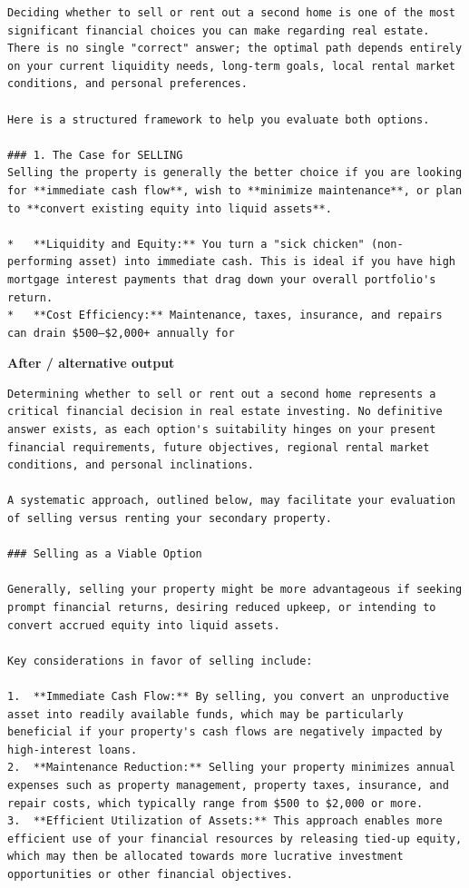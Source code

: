 \begin{Verbatim}
Deciding whether to sell or rent out a second home is one of the most significant financial choices you can make regarding real estate. There is no single "correct" answer; the optimal path depends entirely on your current liquidity needs, long-term goals, local rental market conditions, and personal preferences.

Here is a structured framework to help you evaluate both options.

### 1. The Case for SELLING
Selling the property is generally the better choice if you are looking for **immediate cash flow**, wish to **minimize maintenance**, or plan to **convert existing equity into liquid assets**.

*   **Liquidity and Equity:** You turn a "sick chicken" (non-performing asset) into immediate cash. This is ideal if you have high mortgage interest payments that drag down your overall portfolio's return.
*   **Cost Efficiency:** Maintenance, taxes, insurance, and repairs can drain $500–$2,000+ annually for
\end{Verbatim}

\textbf{After / alternative output}

\begin{Verbatim}
Determining whether to sell or rent out a second home represents a critical financial decision in real estate investing. No definitive answer exists, as each option's suitability hinges on your present financial requirements, future objectives, regional rental market conditions, and personal inclinations.

A systematic approach, outlined below, may facilitate your evaluation of selling versus renting your secondary property.

### Selling as a Viable Option

Generally, selling your property might be more advantageous if seeking prompt financial returns, desiring reduced upkeep, or intending to convert accrued equity into liquid assets.

Key considerations in favor of selling include:

1.  **Immediate Cash Flow:** By selling, you convert an unproductive asset into readily available funds, which may be particularly beneficial if your property's cash flows are negatively impacted by high-interest loans.
2.  **Maintenance Reduction:** Selling your property minimizes annual expenses such as property management, property taxes, insurance, and repair costs, which typically range from $500 to $2,000 or more.
3.  **Efficient Utilization of Assets:** This approach enables more efficient use of your financial resources by releasing tied-up equity, which may then be allocated towards more lucrative investment opportunities or other financial objectives.
\end{Verbatim}

